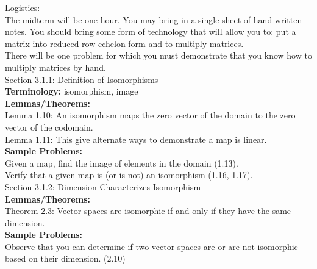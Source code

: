 \documentclass[11pt,fleqn]{article}
\begin{document}
\renewcommand{\headrulewidth}{0pt}
\newcommand{\blank}[1]{\rule{#1}{0.75pt}}
\renewcommand{\d}{\displaystyle}

\vspace*{-0.7in}

\begin{center}
  \large {}
\end{center}

\noindent Logistics:\\
The midterm will be one hour. You may bring in a single sheet of hand written notes. You should bring some form of technology that will allow you to: put a matrix into reduced row echelon form and to multiply matrices.\\
There will be one problem for which you must demonstrate that you know how to multiply matrices by hand.\\

\noindent Section 3.1.1: Definition of Isomorphisms\\

\textbf{Terminology:} isomorphism, image\\

\textbf{Lemmas/Theorems:}  \\
Lemma 1.10: An isomorphism maps the zero vector of the domain to the zero vector of the codomain.\\
Lemma 1.11: This give alternate ways to demonstrate a map is linear.\\

\textbf{Sample Problems:} \\
Given a map, find the image of elements in the domain (1.13). \\
Verify that a given map is (or is not) an isomorphism (1.16, 1.17).\\

\noindent Section 3.1.2: Dimension Characterizes Isomorphism\\


\textbf{Lemmas/Theorems:} \\
Theorem 2.3: Vector spaces are isomorphic if and only if they have the same dimension.\\

\textbf{Sample Problems:} \\
Observe that you can determine if two vector spaces are or are not isomorphic based on their dimension. (2.10)\\
\end{document}
